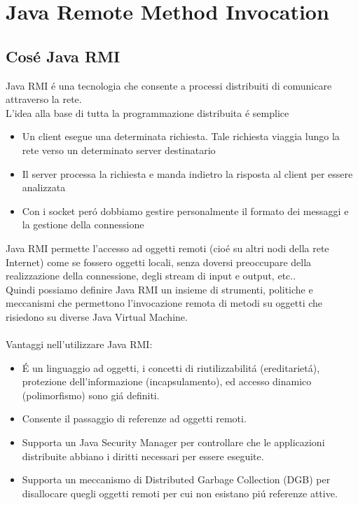 \documentclass[a4paper, 12 pt, italian]{report}
\begin{document}
\chapter{Java Remote Method Invocation}

\section{Cos\'e Java RMI}
Java RMI \'e una tecnologia che consente a processi distribuiti di comunicare attraverso la rete.\\

L'idea alla base di tutta la programmazione distribuita \'e semplice
\begin{itemize}
\item Un client esegue una determinata richiesta. Tale richiesta viaggia lungo la rete verso un determinato server destinatario

\item Il server processa la richiesta e manda indietro la risposta al client per essere analizzata

\item Con i socket per\'o dobbiamo gestire personalmente il formato dei messaggi e la gestione della connessione

\end{itemize}
Java RMI permette l'accesso ad oggetti remoti (cio\'e su altri nodi della rete Internet) come se fossero oggetti locali, senza doversi preoccupare della realizzazione della connessione, degli stream di input e output, etc..\\
Quindi possiamo definire Java RMI un insieme di strumenti, politiche e meccanismi che permettono l'invocazione remota di metodi su oggetti che risiedono su diverse Java Virtual Machine.\\
\\
Vantaggi nell'utilizzare Java RMI:

\begin{itemize}

\item \'E un linguaggio ad oggetti, i concetti di riutilizzabilit\'a (ereditariet\'a), protezione dell'informazione (incapsulamento), ed accesso dinamico (polimorfismo) sono gi\'a definiti.

\item Consente il passaggio di referenze ad oggetti remoti.

\item Supporta un Java Security Manager per controllare che le applicazioni distribuite abbiano i diritti necessari per essere eseguite.

\item Supporta un meccanismo di Distributed Garbage Collection (DGB) per disallocare quegli oggetti remoti per cui non esistano pi\'u referenze attive.

\end{itemize}
\end{document}
